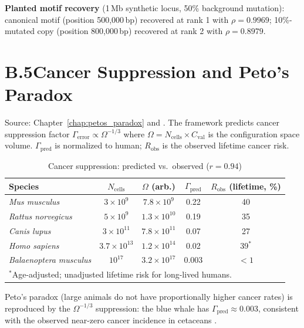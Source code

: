 \noindent
\textbf{Planted motif recovery} (1\,Mb synthetic locus, 50\% background mutation):
canonical motif (position 500,000\,bp) recovered at rank 1 with $\rho = 0.9969$;
10\%-mutated copy (position 800,000\,bp) recovered at rank 2 with $\rho = 0.8979$.

\section*{B.5\quad Cancer Suppression and Peto's Paradox}
\label{app:cancer_table}

\noindent
Source: Chapter~\ref{chap:petos_paradox} and \citet{Sachikonye2025_Peto}.
The framework predicts cancer suppression factor $\Gamma_{\mathrm{error}} \propto \Omega^{-1/3}$
where $\Omega = N_{\mathrm{cells}} \times C_{\mathrm{val}}$ is the configuration
space volume. $\Gamma_{\mathrm{pred}}$ is normalized to human; $R_{\mathrm{obs}}$
is the observed lifetime cancer risk.

\vspace{6pt}

\begin{table}[H]
\centering
\caption{Cancer suppression: predicted vs.\ observed ($r = 0.94$)}
\label{tab:cancer_suppression}
\begin{tabular}{lcccc}
\toprule
Species & $N_{\mathrm{cells}}$ & $\Omega$ (arb.) &
$\Gamma_{\mathrm{pred}}$ & $R_{\mathrm{obs}}$ (lifetime, \%) \\
\midrule
\textit{Mus musculus}    & $3 \times 10^9$   & $7.8 \times 10^9$   & 0.22 & 40 \\
\textit{Rattus norvegicus} & $5\times10^9$  & $1.3\times10^{10}$  & 0.19 & 35 \\
\textit{Canis lupus}     & $3 \times 10^{11}$ & $7.8\times10^{11}$ & 0.07 & 27 \\
\textit{Homo sapiens}    & $3.7\times10^{13}$ & $1.2\times10^{14}$ & 0.02 & 39$^*$ \\
\textit{Balaenoptera musculus} & $10^{17}$ & $3.2\times10^{17}$  & 0.003 & $<1$ \\
\bottomrule
\multicolumn{5}{l}{$^*$Age-adjusted; unadjusted lifetime risk for long-lived humans.}
\end{tabular}
\end{table}

\noindent
Peto's paradox (large animals do not have proportionally higher cancer rates)
is reproduced by the $\Omega^{-1/3}$ suppression: the blue whale has
$\Gamma_{\mathrm{pred}} \approx 0.003$, consistent with the observed near-zero
cancer incidence in cetaceans \citep{peto1975cancers}.

